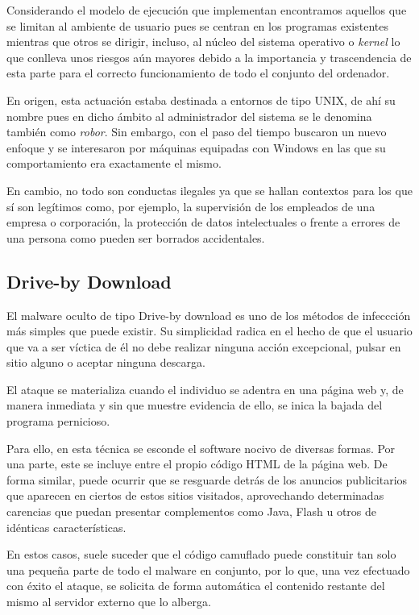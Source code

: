 		Considerando el modelo de ejecución que implementan encontramos aquellos que se limitan al ambiente de usuario pues se centran en los programas existentes mientras que otros se dirigir, incluso, al núcleo del sistema operativo o \textit{kernel} lo que conlleva unos riesgos aún mayores debido a la importancia y trascendencia de esta parte para el correcto funcionamiento de todo el conjunto del ordenador.

		En origen, esta actuación estaba destinada a entornos de tipo UNIX, de ahí su nombre pues en dicho ámbito al administrador del sistema se le denomina también como \textit{robor}. Sin embargo, con el paso del tiempo buscaron un nuevo enfoque y se interesaron por máquinas equipadas con Windows en las que su comportamiento era exactamente el mismo.

		En cambio, no todo son conductas ilegales ya que se hallan contextos para los que sí son legítimos como, por ejemplo, la supervisión de los empleados de una empresa o corporación, la protección de datos intelectuales o frente a errores de una persona como pueden ser borrados accidentales.

	\subsection{Drive-by Download}
		El malware oculto de tipo Drive-by download es uno de los métodos de infeccción más simples que puede existir. Su simplicidad radica en el hecho de que el usuario que va a ser víctica de él no debe realizar ninguna acción excepcional, pulsar en sitio alguno o aceptar ninguna descarga.

		El ataque se materializa cuando el individuo se adentra en una página web y, de manera inmediata y sin que muestre evidencia de ello, se inica la bajada del programa pernicioso.

		Para ello, en esta técnica se esconde el software nocivo de diversas formas. Por una parte, este se incluye entre el propio código HTML de la página web. De forma similar, puede ocurrir que se resguarde detrás de los anuncios publicitarios que aparecen en ciertos de estos sitios visitados, aprovechando determinadas carencias que puedan presentar complementos como Java, Flash u otros de idénticas características.

		En estos casos, suele suceder que el código camuflado puede constituir tan solo una pequeña parte de todo el malware en conjunto, por lo que, una vez efectuado con éxito el ataque, se solicita de forma automática el contenido restante del mismo al servidor externo que lo alberga.

